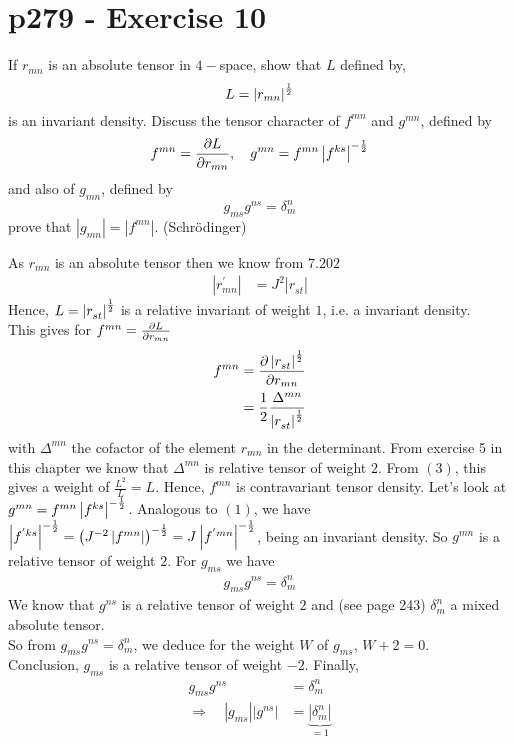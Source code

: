 \section{p279 - Exercise 10}
\begin{tcolorbox}
If $r_{mn}$ is an absolute tensor in $4-$space, show that $L$ defined by,
$$L=\left|r_{mn}\right|^{\frac{1}{2}}$$
is an invariant density. Discuss the tensor character of $f^{mn}$ and $g^{mn}$, defined by
$$f^{mn}=\pdv{L}{r_{mn}}, \quad g^{mn} = f^{mn}\left|f^{ks}\right|^{-\frac{1}{2}}$$
and also of $g_{mn}$, defined by
$$g_{ms}g^{ns}= \delta_m^n$$
prove that $\left|g_{mn}\right| = \left|f^{mn}\right|$. (Schrödinger)
\end{tcolorbox}
As $r_{mn}$ is an absolute tensor then we know from $\mathbf{7.202}$ 
\begin{align}
\left|r^{'}_{mn}\right|&= J^2\left|r^{}_{st}\right|
\end{align}
Hence, $L=\left|r^{}_{st}\right|^{\frac{1}{2}}$ is a relative invariant of weight $1$, i.e. a invariant density.\\
This gives for $f^{mn}=\pdv{L}{r_{mn}}$
\begin{align}
f^{mn}&= \pdv{\left|r^{}_{st}\right|^{\ensuremath{\frac{1}{2}}}}{r_{mn}}\\
&= \frac{1}{2} \frac{\Delta^{mn}}{\left|r^{}_{st}\right|^{\frac{1}{2}}}
\end{align}
with $\Delta^{mn}$ the cofactor of the element $r_{mn}$ in the determinant. From exercise 5 in this chapter we know that $\Delta^{mn}$ is relative tensor of weight $2$. From $(3)$, this  gives a weight of $\frac{L^2}{L}= L$. Hence, $f^{mn}$ is contravariant tensor density.
Let's look at $g^{mn} = f^{mn}\left|f^{ks}\right|^{-\frac{1}{2}}$. Analogous to $(1)$, we have $\left|f^{'ks}\right|^{-\frac{1}{2}} = \left(J^{-2}\left|f^{mn}\right|\right)^{-\frac{1}{2}}=J^{}\left|f^{'mn}\right|^{-\frac{1}{2}}$, being an invariant density. So $g^{mn}$ is a relative tensor of weight $2$.
For  $g_{ms}$ we have 
\begin{align}
g_{ms}g^{ns}= \delta_m^n
\end{align}
We know that $g^{ns}$ is a relative tensor of weight $2$ and (see page 243) $\delta_m^n$ a mixed absolute tensor.\\
So from $g_{ms}g^{ns}= \delta_m^n$, we deduce for the weight $W$ of $g_{ms}$, $W+2 = 0$.\\
Conclusion, $g_{ms}$ is a relative tensor of weight $-2$.
Finally, 
\begin{align}
g_{ms}g^{ns}&= \delta_m^n\\
\Rightarrow \quad \left|g_{ms}\right|\left|g^{ns}\right|&=\underbrace{\left|\delta_m^n\right|}_{=1}
\end{align}
